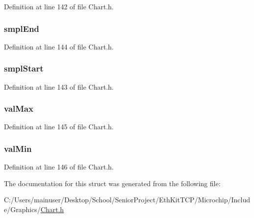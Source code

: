 Definition at line 142 of file Chart.\+h.

\hypertarget{struct_c_h_a_r_t_p_a_r_a_m_a7013921cfa4c9fb854d02ba800fa8543}{}
\subsubsection[{smpl\+End}]{ smpl\+End}\label{struct_c_h_a_r_t_p_a_r_a_m_a7013921cfa4c9fb854d02ba800fa8543}


Definition at line 144 of file Chart.\+h.

\hypertarget{struct_c_h_a_r_t_p_a_r_a_m_adaaddb92a714e509d646adeda8eb6527}{}
\subsubsection[{smpl\+Start}]{ smpl\+Start}\label{struct_c_h_a_r_t_p_a_r_a_m_adaaddb92a714e509d646adeda8eb6527}


Definition at line 143 of file Chart.\+h.

\hypertarget{struct_c_h_a_r_t_p_a_r_a_m_a2b05882760edfbfe7c31d5a9215303c7}{}
\subsubsection[{val\+Max}]{ val\+Max}\label{struct_c_h_a_r_t_p_a_r_a_m_a2b05882760edfbfe7c31d5a9215303c7}


Definition at line 145 of file Chart.\+h.

\hypertarget{struct_c_h_a_r_t_p_a_r_a_m_a6c99a514ebed840b98db54a3e81373d2}{}
\subsubsection[{val\+Min}]{ val\+Min}\label{struct_c_h_a_r_t_p_a_r_a_m_a6c99a514ebed840b98db54a3e81373d2}


Definition at line 146 of file Chart.\+h.



The documentation for this struct was generated from the following file\+:\begin{DoxyCompactItemize}
\item 
C\+:/\+Users/mainuser/\+Desktop/\+School/\+Senior\+Project/\+Eth\+Kit\+T\+C\+P/\+Microchip/\+Include/\+Graphics/\hyperlink{_chart_8h}{Chart.\+h}\end{DoxyCompactItemize}
